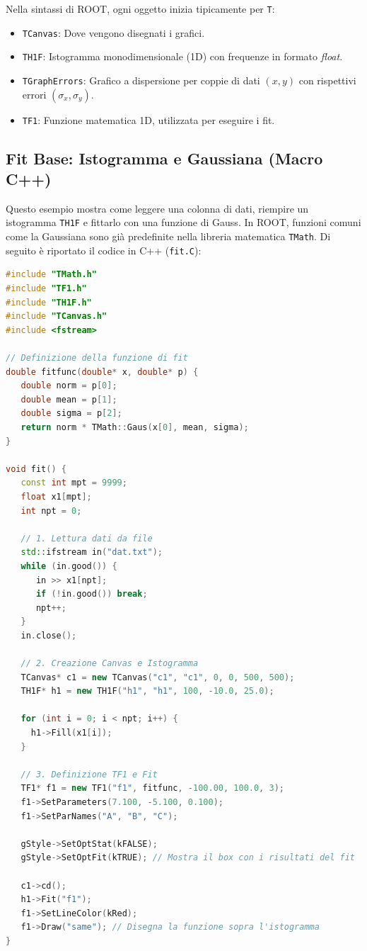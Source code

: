 \documentclass[openany,a4paper,12pt]{book}
\begin{document}
\begin{definizione}[title={Oggetti fondamentali in ROOT}]
Nella sintassi di ROOT, ogni oggetto inizia tipicamente per \texttt{T}:
\begin{itemize}
    \item \texttt{TCanvas}: Dove vengono disegnati i grafici.
    \item \texttt{TH1F}: Istogramma monodimensionale (1D) con frequenze in formato \textit{float}.
    \item \texttt{TGraphErrors}: Grafico a dispersione per coppie di dati $(x,y)$ con rispettivi errori $(\sigma_x, \sigma_y)$.
    \item \texttt{TF1}: Funzione matematica 1D, utilizzata per eseguire i fit.
\end{itemize}
\end{definizione}

\subsection*{Fit Base: Istogramma e Gaussiana (Macro C++)}

Questo esempio mostra come leggere una colonna di dati, riempire un istogramma \texttt{TH1F} e fittarlo con una funzione di Gauss. In ROOT, funzioni comuni come la Gaussiana sono già predefinite nella libreria matematica \texttt{TMath}. 
Di seguito è riportato il codice in C++ (\texttt{fit.C}):

\begin{lstlisting}[language=C++, caption={Macro C++ per fit Gaussiano con ROOT}]
#include "TMath.h"
#include "TF1.h"
#include "TH1F.h"
#include "TCanvas.h"
#include <fstream>

// Definizione della funzione di fit
double fitfunc(double* x, double* p) {
   double norm = p[0];
   double mean = p[1];
   double sigma = p[2];
   return norm * TMath::Gaus(x[0], mean, sigma);
}

void fit() {
   const int mpt = 9999;
   float x1[mpt];
   int npt = 0;

   // 1. Lettura dati da file
   std::ifstream in("dat.txt");
   while (in.good()) {
      in >> x1[npt];
      if (!in.good()) break;
      npt++;
   }
   in.close();

   // 2. Creazione Canvas e Istogramma
   TCanvas* c1 = new TCanvas("c1", "c1", 0, 0, 500, 500);
   TH1F* h1 = new TH1F("h1", "h1", 100, -10.0, 25.0);

   for (int i = 0; i < npt; i++) {
     h1->Fill(x1[i]);
   }

   // 3. Definizione TF1 e Fit
   TF1* f1 = new TF1("f1", fitfunc, -100.00, 100.0, 3);
   f1->SetParameters(7.100, -5.100, 0.100);
   f1->SetParNames("A", "B", "C");

   gStyle->SetOptStat(kFALSE);
   gStyle->SetOptFit(kTRUE); // Mostra il box con i risultati del fit

   c1->cd();
   h1->Fit("f1");
   f1->SetLineColor(kRed);
   f1->Draw("same"); // Disegna la funzione sopra l'istogramma
}
\end{lstlisting}
\end{document}
